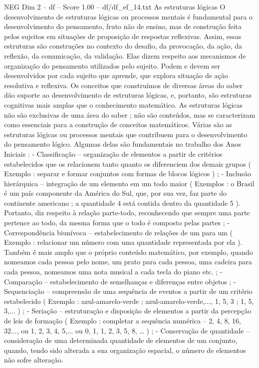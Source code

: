 \begin{textsample}{NEG Dim 2 – df – Score 1.00 – df/df\_ef\_14.txt}  \label{ex:f2_neg_167}
As estruturas lógicas O desenvolvimento de estruturas lógicas ou processos mentais é fundamental para o desenvolvimento do pensamento, fruto não de ensino, mas de construção feita pelos sujeitos em situações de proposição de respostas reflexivas.
Assim, essas estruturas são construções no contexto do desafio, da provocação, da ação, da reflexão, da comunicação, da validação.
Elas dizem respeito aos mecanismos de organização do pensamento utilizados pelo sujeito.
Podem e devem ser desenvolvidos por cada sujeito que aprende, que explora situação de ação resolutiva e reflexiva.
Os conceitos que construímos de diversas áreas do saber dão suporte ao desenvolvimento de estruturas lógicas, e, portanto, são estruturas cognitivas mais amplas que o conhecimento matemático.
As estruturas lógicas não são exclusivas de uma área do saber ; não são conteúdos, mas se caracterizam como essenciais para a construção de conceitos matemáticos.
Várias são as estruturas lógicas ou processos mentais que contribuem para o desenvolvimento do pensamento lógico.
Algumas delas são fundamentais no trabalho dos Anos Iniciais : - Classificação – organização de elementos a partir de critérios estabelecidos que os relacionem tanto quanto os diferenciem dos demais grupos ( Exemplo : separar e formar conjuntos com formas de blocos lógicos ) ; - Inclusão hierárquica – integração de um elemento em um todo maior ( Exemplos : o Brasil é um país componente da América do Sul, que, por sua vez, faz parte do continente americano ; a quantidade 4 está contida dentro da quantidade 5 ).
Portanto, diz respeito à relação parte-todo, reconhecendo que sempre uma parte pertence ao todo, da mesma forma que o todo é composto pelas partes ; - Correspondência biunívoca – estabelecimento de relações de um para um ( Exemplo : relacionar um número com uma quantidade representada por ela ).
Também é mais amplo que o próprio conteúdo matemático, por exemplo, quando nomeamos cada pessoa pelo nome, um prato para cada pessoa, uma cadeira para cada pessoa, nomeamos uma nota musical a cada tecla do piano etc. ; - Comparação – estabelecimento de semelhanças e diferenças entre objetos ; - Sequenciação – compreensão de uma sequência de eventos a partir de um critério estabelecido ( Exemplo : azul-amarelo-verde ; azul-amarelo-verde,..., 1, 5, 3 ; 1, 5, 3,... ) ; - Seriação – estruturação e disposição de elementos a partir da percepção de leis de formação ( Exemplo : completar a sequência numérica – 2, 4, 8, 16, 32..., ou 1, 2, 3, 4, 5,... ou 0, 1, 1, 2, 3, 5, 8, … ) ; - Conservação de quantidade – consideração de uma determinada quantidade de elementos de um conjunto, quando, tendo sido alterada a sua organização espacial, o número de elementos não sofre alteração.

\end{textsample}
